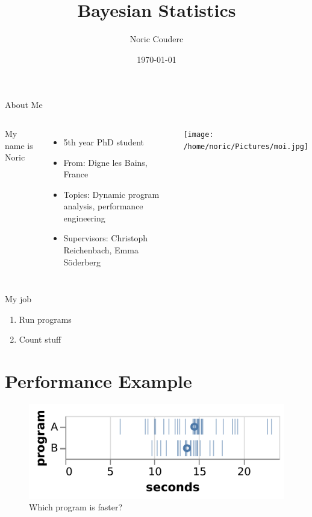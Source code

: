 \documentclass[aspectratio=169,xcolor=svgnames]{beamer}
\title[]{Bayesian Statistics}
\author{Noric Couderc}
\date{\today}
\institute{Lund University\\Department of Computer Science}
\begin{document}
\maketitle

\begin{frame}{About Me}
  \begin{columns}
    My name is Noric

    \begin{itemize}
    \item 5th year PhD student
    \item From: Digne les Bains, France
    \item Topics: Dynamic program analysis, performance engineering
    \item Supervisors: Christoph Reichenbach, Emma Söderberg
    \end{itemize}

    \texttt{[image: /home/noric/Pictures/moi.jpg]}

  \end{columns}
\end{frame}

\begin{frame}
  \begin{block}{My job}
  \begin{enumerate}
  \item <2->Run programs
  \item <3->Count stuff 
  \end{enumerate}
  \end{block}
\end{frame}

\section{Performance Example}

\begin{frame}
  \begin{figure}[ht]
    \centering
    \includegraphics[width=\textwidth]{figures/samples_a_b.pdf}
    \caption{Which program is faster?}
  \end{figure}
\end{frame}
\end{document}
